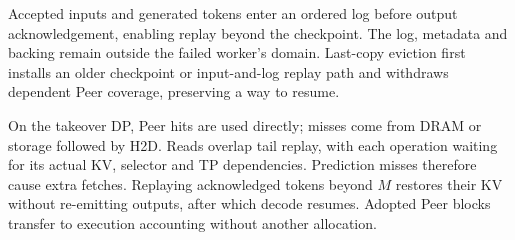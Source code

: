Accepted inputs and generated tokens enter an ordered log before output
acknowledgement, enabling replay beyond the checkpoint. The log, metadata
and backing remain outside the failed worker's domain. Last-copy eviction
first installs an older checkpoint or input-and-log replay path and
withdraws dependent Peer coverage, preserving a way to resume.

On the takeover DP, Peer hits are used directly; misses come from DRAM
or storage followed by H2D. Reads overlap tail replay, with each operation
waiting for its actual KV, selector and TP dependencies. Prediction misses
therefore cause extra fetches. Replaying acknowledged tokens beyond $M$
restores their KV without re-emitting outputs, after which decode resumes.
Adopted Peer blocks transfer to execution accounting without another allocation.
